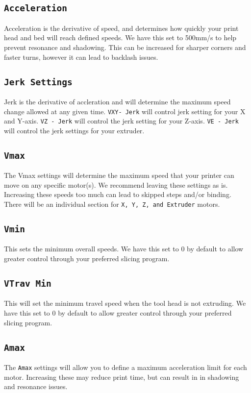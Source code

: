 \subsection{\texttt{Acceleration}}
Acceleration is the derivative of speed, and determines how quickly your print head and bed will reach defined speeds. We have this set to 500mm/s\textsuperscript{} to help prevent resonance and shadowing. This can be increased for sharper corners and faster turns, however it can lead to backlash issues.

\subsection{\texttt{Jerk Settings}}
Jerk is the derivative of accleration and will determine the maximum speed change allowed at any given time. \texttt{VXY- Jerk} will control jerk setting for your X and Y-axis. \texttt{VZ - Jerk} will control the jerk setting for your Z-axis. \texttt{VE - Jerk} will control the jerk settings for your extruder.

\subsection{\texttt{Vmax}}
The Vmax settings will determine the maximum speed that your printer can move on any specific motor(s). We recommend leaving these settings as is. Increasing these speeds too much can lead to skipped steps and/or binding. There will be an individual section for \texttt{X, Y, Z, and Extruder} motors. 

\subsection{\texttt{Vmin}}
This sets the minimum overall speeds. We have this set to 0 by default to allow greater control through your preferred slicing program. 

\subsection{\texttt{VTrav Min}}
This will set the minimum travel speed when the tool head is not extruding. We have this set to 0 by default to allow greater control through your preferred slicing program. 

\subsection{\texttt{Amax}}
The \texttt{Amax} settings will allow you to define a maximum acceleration limit for each motor. Increasing these may reduce print time, but can result in in shadowing and resonance issues.

